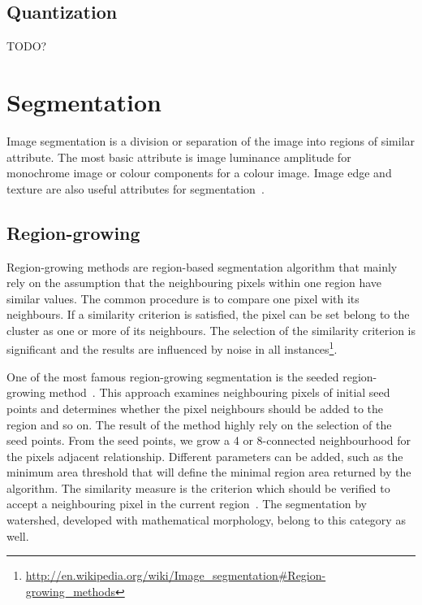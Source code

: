 \subsection*{Quantization} %
\label{sub:quantization}
TODO?




\section*{Segmentation} %
\label{sub:ap:segmentation}
Image segmentation is a division or separation of the image into regions of similar attribute.
The most basic attribute is image luminance amplitude for monochrome image or colour components for a colour image.
Image edge and texture are also useful attributes for segmentation~\cite{Pratt2007Digital}.

\subsection*{Region-growing} %
\label{sub:ap:region_growing}
Region-growing methods are region-based segmentation algorithm that mainly rely on the assumption that the neighbouring pixels within one region have similar values.
The common procedure is to compare one pixel with its neighbours.
If a similarity criterion is satisfied, the pixel can be set belong to the cluster as one or more of its neighbours.
The selection of the similarity criterion is significant and the results are influenced by noise in all instances\footnote{\url{http://en.wikipedia.org/wiki/Image_segmentation\#Region-growing_methods}}.

One of the most famous region-growing segmentation is the seeded region-growing method~\cite{adams1994seeded,mehnert1997improved}.
This approach examines neighbouring pixels of initial seed points and determines whether the pixel neighbours should be added to the region and so on.
The result of the method highly rely on the selection of the seed points.
From the seed points, we grow a 4 or 8-connected neighbourhood for the pixels adjacent relationship.
Different parameters can be added, such as the minimum area threshold that will define the minimal region area returned by the algorithm.
The similarity measure is the criterion which should be verified to accept a neighbouring pixel in the current region~\cite{Gonzalez1992Digital}.
The segmentation by watershed, developed with mathematical morphology, belong to this category as well.

